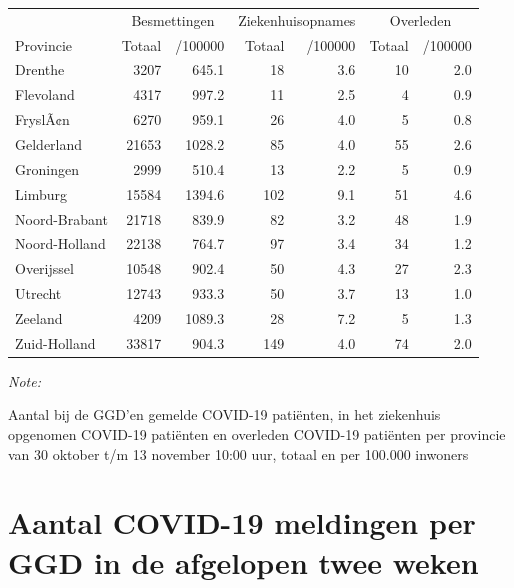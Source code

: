 \documentclass[
  english,
  man,floatsintext]{apa6}
\begin{document}
\begin{table}
\centering
\begin{threeparttable}
\begin{tabular}{lrrrrrr}
\toprule
\multicolumn{1}{c}{ } & \multicolumn{2}{c}{Besmettingen} & \multicolumn{2}{c}{Ziekenhuisopnames} & \multicolumn{2}{c}{Overleden} \\
\cmidrule(l{3pt}r{3pt}){2-3} \cmidrule(l{3pt}r{3pt}){4-5} \cmidrule(l{3pt}r{3pt}){6-7}
Provincie & Totaal & /100000 & Totaal & /100000 & Totaal & /100000\\
\midrule
Drenthe & 3207 & 645.1 & 18 & 3.6 & 10 & 2.0\\
Flevoland & 4317 & 997.2 & 11 & 2.5 & 4 & 0.9\\
FryslÃ¢n & 6270 & 959.1 & 26 & 4.0 & 5 & 0.8\\
Gelderland & 21653 & 1028.2 & 85 & 4.0 & 55 & 2.6\\
Groningen & 2999 & 510.4 & 13 & 2.2 & 5 & 0.9\\
Limburg & 15584 & 1394.6 & 102 & 9.1 & 51 & 4.6\\
Noord-Brabant & 21718 & 839.9 & 82 & 3.2 & 48 & 1.9\\
Noord-Holland & 22138 & 764.7 & 97 & 3.4 & 34 & 1.2\\
Overijssel & 10548 & 902.4 & 50 & 4.3 & 27 & 2.3\\
Utrecht & 12743 & 933.3 & 50 & 3.7 & 13 & 1.0\\
Zeeland & 4209 & 1089.3 & 28 & 7.2 & 5 & 1.3\\
Zuid-Holland & 33817 & 904.3 & 149 & 4.0 & 74 & 2.0\\
\bottomrule
\end{tabular}
\begin{tablenotes}
\item \textit{Note: } 
\item Aantal bij de GGD’en gemelde COVID-19 patiënten, in het ziekenhuis opgenomen COVID-19 patiënten en overleden COVID-19 patiënten per provincie van 30 oktober t/m 13 november 10:00 uur, totaal en per 100.000 inwoners
\end{tablenotes}
\end{threeparttable}
\end{table}

\newpage

\hypertarget{aantal-covid-19-meldingen-per-ggd-in-de-afgelopen-twee-weken}{%
\section{Aantal COVID-19 meldingen per GGD in de afgelopen twee weken}\label{aantal-covid-19-meldingen-per-ggd-in-de-afgelopen-twee-weken}}
\end{document}
